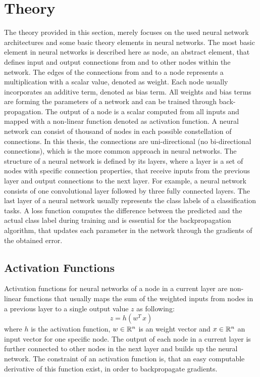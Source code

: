 
\section{Theory}\label{sec:nn_theory}
\thesisStateReady
The theory provided in this section, merely focuses on the used neural network architectures and some basic theory elements in neural networks.
The most basic element in neural networks is described here as node, an abstract element, that defines input and output connections from and to other nodes within the network.
The edges of the connections from and to a node represents a multiplication with a scalar value, denoted as weight.
Each node usually incorporates an additive term, denoted as bias term.
All weights and bias terms are forming the parameters of a network and can be trained through back-propagation.
The output of a node is a scalar computed from all inputs and mapped with a non-linear function denoted as activation function.
A neural network can consist of thousand of nodes in each possible constellation of connections.
In this thesis, the connections are uni-directional (no bi-directional connections), which is the more common approach in neural networks.
The structure of a neural network is defined by its layers, where a layer is a set of nodes with specific connection properties, that receive inputs from the previous layer and output connections to the next layer.
For example, a neural network consists of one convolutional layer followed by three fully connected layers.
The last layer of a neural network usually represents the class labels of a classification tasks.
A loss function computes the difference between the predicted and the actual class label during training and is essential for the backpropagation algorithm, that updates each parameter in the network through the gradients of the obtained error.



\subsection{Activation Functions}\label{sec:nn_theory_acti}
Activation functions for neural networks of a node in a current layer are non-linear functions that usually maps the sum of the weighted inputs from nodes in a previous layer to a single output value $z$ as following:
\begin{equation}\label{eq:nn_theory_acti}
  z = h(w^T \, x)
\end{equation}
where $h$ is the activation function, $w \in \mathbb{R}^n$ is an weight vector and $x \in \mathbb{R}^n$ an input vector for one specific node.
The output of each node in a current layer is further connected to other nodes in the next layer and builds up the neural network.
The constraint of an activation function is, that an easy computable derivative of this function exist, in order to backpropagate gradients.

